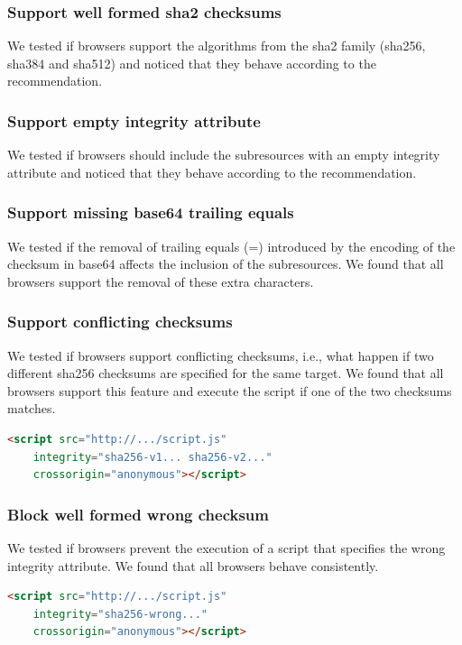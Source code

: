 \documentclass[sigconf,table]{acmart}
\begin{document}
\subsubsection{Support well formed sha2 checksums}
We tested if browsers support the algorithms from the sha2 family (sha256, sha384 and sha512) and noticed that they behave according to the recommendation.

\subsubsection{Support empty integrity attribute}
We tested if browsers should include the subresources with an empty integrity attribute and noticed that they behave according to the recommendation.

\subsubsection{Support missing base64 trailing equals}
We tested if the removal of trailing equals (=) introduced by the encoding of the checksum in base64 affects the inclusion of the subresources.
We found that all browsers support the removal of these extra characters.

\subsubsection{Support conflicting checksums}
We tested if browsers support conflicting checksums, i.e., what happen if two different sha256 checksums are specified for the same target.
We found that all browsers support this feature and execute the script if one of the two checksums matches.

\begin{lstlisting}[language=HTML, basicstyle=\small]
<script src="http://.../script.js" 
	integrity="sha256-v1... sha256-v2..." 
	crossorigin="anonymous"></script>
\end{lstlisting}

\subsubsection{Block well formed wrong checksum}
We tested if browsers prevent the execution of a script that specifies the wrong integrity attribute.
We found that all browsers behave consistently.

\begin{lstlisting}[language=HTML, basicstyle=\small]
<script src="http://.../script.js" 
	integrity="sha256-wrong..." 
	crossorigin="anonymous"></script>
\end{lstlisting}
\end{document}
